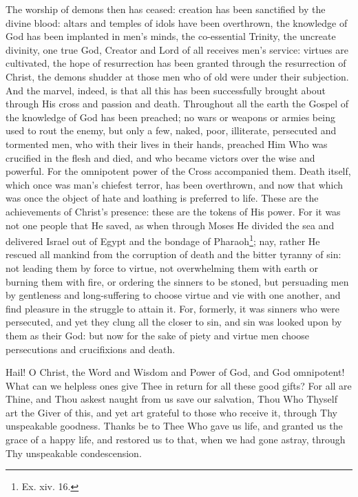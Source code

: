 The worship of demons then has ceased: creation has been sanctified by the divine blood: altars and temples of idols have been overthrown, the knowledge of God has been implanted in men’s minds, the co-essential Trinity, the uncreate divinity, one true God, Creator and Lord of all receives men’s service: virtues are cultivated, the hope of resurrection has been granted through the resurrection of Christ, the demons shudder at those men who of old were under their subjection. And the marvel, indeed, is that all this has been successfully brought about through His cross and passion and death. Throughout all the earth the Gospel of the knowledge of God has been preached; no wars or weapons or armies being used to rout the enemy, but only a few, naked, poor, illiterate, persecuted and tormented men, who with their lives in their hands, preached Him Who was crucified in the flesh and died, and who became victors over the wise and powerful. For the omnipotent power of the Cross accompanied them. Death itself, which once was man’s chiefest terror, has been overthrown, and now that which was once the object of hate and loathing is preferred to life. These are the achievements of Christ’s presence: these are the tokens of His power. For it was not one people that He saved, as when through Moses He divided the sea and delivered Israel out of Egypt and the bondage of Pharaoh\footnote{Ex. xiv. 16.}; nay, rather He rescued all mankind from the corruption of death and the bitter tyranny of sin: not leading them by force to virtue, not overwhelming them with earth or burning them with fire, or ordering the sinners to be stoned, but persuading men by gentleness and long-suffering to choose virtue and vie with one another, and find pleasure in the struggle to attain it. For, formerly, it was sinners who were persecuted, and yet they clung all the closer to sin, and sin was looked upon by them as their God: but now for the sake of piety and virtue men choose persecutions and crucifixions and death.

Hail! O Christ, the Word and Wisdom and Power of God, and God omnipotent! What can we helpless ones give Thee in return for all these good gifts? For all are Thine, and Thou askest naught from us save our salvation, Thou Who Thyself art the Giver of this, and yet art grateful to those who receive it, through Thy unspeakable goodness. Thanks be to Thee Who gave us life, and granted us the grace of a happy life, and restored us to that, when we had gone astray, through Thy unspeakable condescension.

